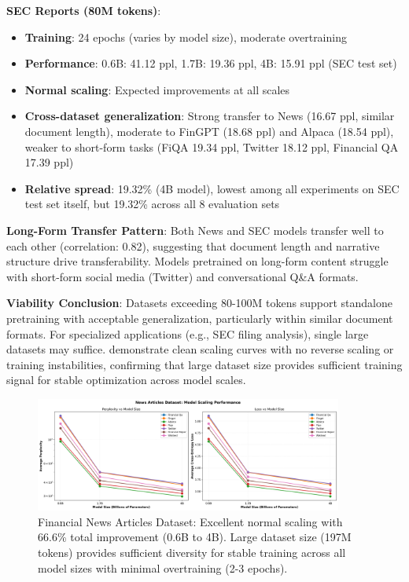 \textbf{SEC Reports (80M tokens)}:
\begin{itemize}
\item \textbf{Training}: 24 epochs (varies by model size), moderate overtraining
\item \textbf{Performance}: 0.6B: 41.12 ppl, 1.7B: 19.36 ppl, 4B: 15.91 ppl (SEC test set)
\item \textbf{Normal scaling}: Expected improvements at all scales
\item \textbf{Cross-dataset generalization}: Strong transfer to News (16.67 ppl, similar document length), moderate to FinGPT (18.68 ppl) and Alpaca (18.54 ppl), weaker to short-form tasks (FiQA 19.34 ppl, Twitter 18.12 ppl, Financial QA 17.39 ppl)
\item \textbf{Relative spread}: 19.32\% (4B model), lowest among all experiments on SEC test set itself, but 19.32\% across all 8 evaluation sets
\end{itemize}

\textbf{Long-Form Transfer Pattern}: Both News and SEC models transfer well to each other (correlation: 0.82), suggesting that document length and narrative structure drive transferability. Models pretrained on long-form content struggle with short-form social media (Twitter) and conversational Q\&A formats.

\textbf{Viability Conclusion}: Datasets exceeding 80-100M tokens support standalone pretraining with acceptable generalization, particularly within similar document formats. For specialized applications (e.g., SEC filing analysis), single large datasets may suffice.  demonstrate clean scaling curves with no reverse scaling or training instabilities, confirming that large dataset size provides sufficient training signal for stable optimization across model scales.

\begin{figure}[h]
\centering
\includegraphics[width=0.9\textwidth]{figures/scaling_news_articles.png}
\caption[Financial News Dataset: Scaling Behavior]{Financial News Articles Dataset: Excellent normal scaling with 66.6\% total improvement (0.6B to 4B). Large dataset size (197M tokens) provides sufficient diversity for stable training across all model sizes with minimal overtraining (2-3 epochs).}
\label{fig:scaling_news_articles}
\end{figure}

